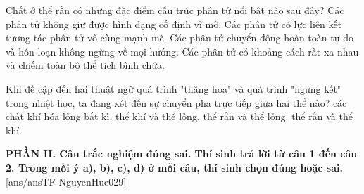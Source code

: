 \begin{ex}	Chất ở thể rắn có những đặc điểm cấu trúc phân tử nổi bật nào sau đây?
	\choice
	{Các phân tử không giữ được hình dạng cố định vĩ mô.}
	{\True Các phân tử có lực liên kết tương tác phân tử vô cùng mạnh mẽ.}
	{Các phân tử chuyển động hoàn toàn tự do và hỗn loạn không ngừng về mọi hướng.}
	{Các phân tử có khoảng cách rất xa nhau và chiếm toàn bộ thể tích bình chứa.}
\end{ex}

\begin{ex}	Khi đề cập đến hai thuật ngữ quá trình "thăng hoa" và quá trình "ngưng kết" trong nhiệt học, ta đang xét đến sự chuyển pha trực tiếp giữa hai thể nào?
	\choice
	{các chất khí hóa lỏng bất kì.}
	{thể khí và thể lỏng.}
	{thể rắn và thể lỏng.}
	{\True thể rắn và thể khí.}
\end{ex}


\noindent \textbf{PHẦN II. Câu trắc nghiệm đúng sai. Thí sinh trả lời từ câu 1 đến câu 2. Trong mỗi ý a), b), c), d) ở mỗi câu, thí sinh chọn đúng hoặc sai.}
[ans/ansTF-NguyenHue029]

